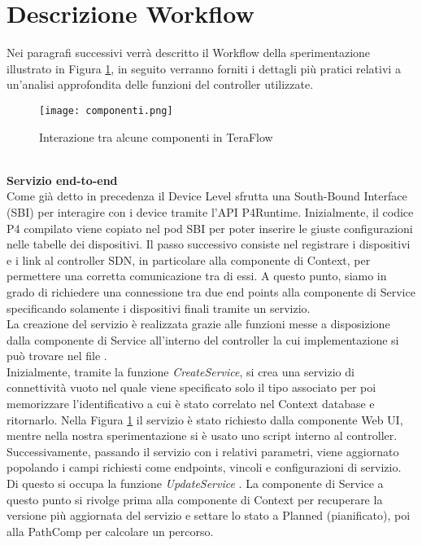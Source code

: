 \section{Descrizione Workflow}
Nei paragrafi successivi verrà descritto il Workflow della sperimentazione illustrato in Figura \ref{fig:componenti}, in seguito verranno 
forniti i dettagli più pratici relativi a un'analisi approfondita delle funzioni del controller utilizzate.
\begin{figure}[h]
    \centering
   \texttt{[image: componenti.png]}
    \caption{Interazione tra alcune componenti in TeraFlow}
    \label{fig:componenti}
\end{figure}
\\\textbf{Servizio end-to-end}
\\Come già detto in precedenza il Device Level sfrutta una South-Bound Interface (SBI) per interagire con i device tramite l'API P4Runtime. 
Inizialmente, il codice P4 compilato viene copiato nel pod SBI per poter inserire le giuste configurazioni nelle tabelle dei dispositivi.
Il passo successivo consiste nel registrare i dispositivi e i link al controller SDN, in particolare alla componente di Context, per permettere una corretta comunicazione tra di essi.
A questo punto, siamo in grado di richiedere una connessione tra due end points alla componente di Service specificando solamente i dispositivi finali tramite un servizio.
\\La creazione del servizio è realizzata grazie alle funzioni messe a disposizione dalla componente di Service all'interno del controller la cui implementazione si può trovare nel file \cite{servserv}. 
\\Inizialmente, tramite la funzione \textit{CreateService}, si crea una servizio di connettività vuoto nel quale viene specificato solo il tipo associato per poi memorizzare l'identificativo  
a cui è stato correlato nel Context database e ritornarlo.
Nella Figura \ref{fig:componenti} il servizio è stato richiesto dalla componente Web UI, mentre nella nostra sperimentazione si è usato uno script interno al controller.
Successivamente, passando il servizio con i relativi parametri, viene aggiornato popolando i campi richiesti come endpoints, vincoli e configurazioni di servizio. 
Di questo si occupa la funzione \textit{UpdateService} \cite{D32}.
La componente di Service a questo punto si rivolge prima alla componente di Context per recuperare la versione più aggiornata del servizio e settare lo stato a Planned (pianificato), poi alla PathComp per calcolare un percorso.
